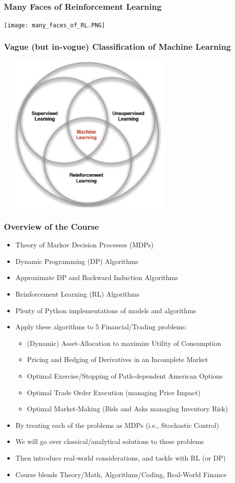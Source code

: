 \documentclass[handout]{beamer}
\begin{document}
\begin{frame}
\frametitle{Many Faces of Reinforcement Learning}
\texttt{[image: many\_faces\_of\_RL.PNG]}
\end{frame}

\begin{frame}
\frametitle{Vague (but in-vogue) Classification of Machine Learning}
\includegraphics[width=9cm, height=8cm]{MLBranches.PNG}
\end{frame}

\begin{frame}
\frametitle{Overview of the Course}
\pause
\begin{itemize}[<+->]
\item Theory of Markov Decision Processes (MDPs)
\item Dynamic Programming (DP) Algorithms
\item Approximate DP and Backward Induction Algorithms
\item Reinforcement Learning (RL) Algorithms
\item Plenty of Python implementations of models and algorithms
\item Apply these algorithms to 5 Financial/Trading problems:
\begin{itemize}
\item (Dynamic) Asset-Allocation to maximize Utility of Consumption
\item Pricing and Hedging of Derivatives in an Incomplete Market
\item Optimal Exercise/Stopping of Path-dependent American Options
\item Optimal Trade Order Execution (managing Price Impact)
\item Optimal Market-Making (Bids and Asks managing Inventory Risk)
\end{itemize}
\item By treating each of the problems as MDPs (i.e., Stochastic Control)
\item We will go over classical/analytical solutions to these problems
\item Then introduce real-world considerations, and tackle with RL (or DP)
\item Course blends Theory/Math, Algorithms/Coding, Real-World Finance
\end{itemize}
\end{frame}
\end{document}
